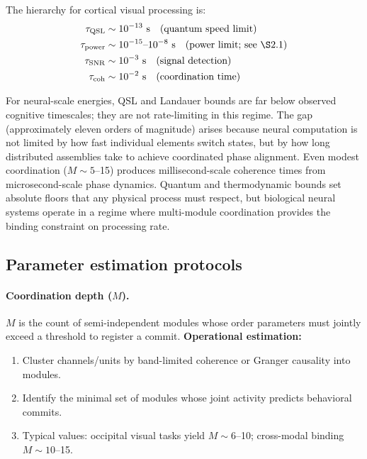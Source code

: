 \documentclass[12pt]{article}
\begin{document}
The hierarchy for cortical visual processing is:
\begin{align}
\tau_{\mathrm{QSL}} &\sim 10^{-13} \text{ s} \quad \text{(quantum speed limit)} \\
\tau_{\mathrm{power}} &\sim 10^{-15}\text{--}10^{-8} \text{ s} \quad \text{(power limit; see \S2.1)} \\
\tau_{\mathrm{SNR}} &\sim 10^{-3} \text{ s} \quad \text{(signal detection)} \\
\tau_{\mathrm{coh}} &\sim 10^{-2} \text{ s} \quad \text{(coordination time)}
\end{align}

For neural-scale energies, QSL and Landauer bounds are far below observed cognitive timescales; they are not rate-limiting in this regime. The gap (approximately eleven orders of magnitude) arises because neural computation is not limited by how fast individual elements switch states, but by how long distributed assemblies take to achieve coordinated phase alignment. Even modest coordination ($M \sim 5$--15) produces millisecond-scale coherence times from microsecond-scale phase dynamics. Quantum and thermodynamic bounds set absolute floors that any physical process must respect, but biological neural systems operate in a regime where multi-module coordination provides the binding constraint on processing rate.

\subsection{Parameter estimation protocols}

\paragraph{Coordination depth ($M$).} $M$ is the count of semi-independent modules whose order parameters must jointly exceed a threshold to register a commit.
\textbf{Operational estimation:}
\begin{enumerate}
\item Cluster channels/units by band-limited coherence or Granger causality into modules.
\item Identify the minimal set of modules whose joint activity predicts behavioral commits.
\item Typical values: occipital visual tasks yield $M \sim 6$--10; cross-modal binding $M \sim 10$--15.
\end{enumerate}
\end{document}
